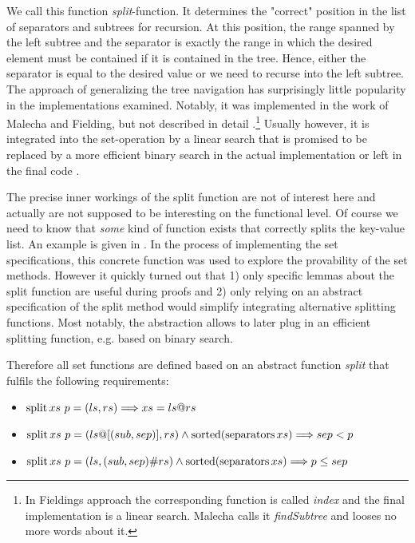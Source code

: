 We call this function \textit{split}-function.
It determines the "correct" position in the list of separators and subtrees
for recursion.
At this position, the range spanned by the left subtree
and the separator is exactly the range in which the desired element
must be contained if it is contained in the tree.
Hence, either the separator is equal to the desired value or
we need to recurse into the left subtree.
The approach of generalizing the tree navigation has
surprisingly little popularity in the implementations examined.
Notably, it was implemented in the work of Malecha and Fielding,
but not described in detail \parencite{DBLP:conf/popl/MalechaMSW10,Fielding80}.\footnote{
    In Fieldings approach the corresponding function is called \textit{index} and the final implementation is a linear search.
    Malecha calls it \textit{findSubtree} and looses no more words about it.
}
Usually however, it is integrated into the set-operation
by a linear search that is promised to be replaced by a more efficient binary search
in the actual implementation \parencite{DBLP:books/daglib/0023376,DBLP:journals/acta/BayerM72}
or left in the final code \parencite{DBLP:journals/sosym/ErnstSR15}.

The precise inner workings of the split function are not of interest here
and actually are not supposed to be interesting on the functional level.
Of course we need to know that \textit{some} kind of function
exists that correctly splits the key-value list.
An example is given in .
In the process of implementing the set specifications,
this concrete function was used to explore the provability of the set methods.
However it quickly turned out that 1) only specific lemmas about the split
function are useful during proofs and 2) only relying on an abstract specification of
the split method would simplify integrating alternative splitting functions.
Most notably, the abstraction allows to later plug in an efficient splitting
function, e.g. based on binary search.


\begin{samepage}
Therefore all set functions are defined based on an abstract function
\textit{split} that fulfils the following requirements:

\begin{itemize}
    \item $\operatorname{split} xs\ p = (ls,rs) \Longrightarrow xs = ls @ rs$
    \item $\operatorname{split} xs\ p = (ls@[(sub,sep)],rs) \wedge \operatorname{sorted} (\operatorname{separators} xs) \Longrightarrow sep < p$
    \item $\operatorname{split} xs\ p = (ls,(sub,sep)\#rs) \wedge \operatorname{sorted} (\operatorname{separators} xs) \Longrightarrow p \le sep$
\end{itemize}
\end{samepage}

